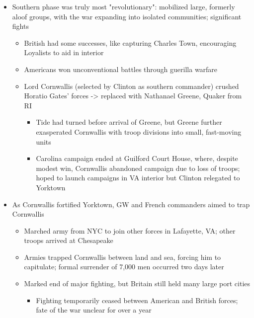 \documentclass[a4paper]{article}
\begin{document}
{\begin{itemize}
\begin{itemize}
                \end{itemize}
                \item Southern phase was truly most "revolutionary": mobilized large, formerly aloof groups, with the war expanding into isolated communities; significant fights
                \begin{itemize}
                    \item British had some successes, like capturing Charles Town, encouraging Loyalists to aid in interior
                    \item Americans won unconventional battles through guerilla warfare
                    \item Lord Cornwallis (selected by Clinton as southern commander) crushed Horatio Gates' forces -> replaced with Nathanael Greene, Quaker from RI
                    \begin{itemize}
                        \item Tide had turned before arrival of Greene, but Greene further exasperated Cornwallis with troop divisions into small, fast-moving units
                        \item Carolina campaign ended at Guilford Court House, where, despite modest win, Cornwallis abandoned campaign due to loss of troops; hoped to launch campaigns in VA interior but Clinton relegated to Yorktown
                    \end{itemize}
                \end{itemize}
                \item As Cornwallis fortified Yorktown, GW and French commanders aimed to trap Cornwallis
                \begin{itemize}
                    \item Marched army from NYC to join other forces in Lafayette, VA; other troops arrived at Chesapeake
                    \item Armies trapped Cornwallis between land and sea, forcing him to capitulate; formal surrender of 7,000 men occurred two days later
                    \item Marked end of major fighting, but Britain still held many large port cities
                    \begin{itemize}
                        \item Fighting temporarily ceased between American and British forces; fate of the war unclear for over a year
                    \end{itemize}
                \end{itemize}
            \end{itemize}}
\end{document}

